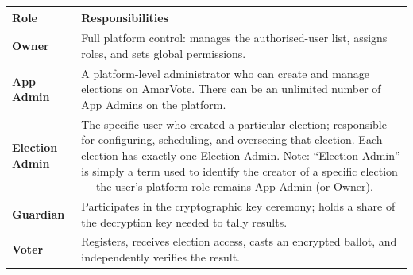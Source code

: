 \documentclass[12pt,a4paper,openany]{book}
\begin{document}
\begin{center}
	\begin{tabularx}{0.95\textwidth}{>{\bfseries}l X}
		\toprule
		\rowcolor{primaryblue}\color{white}Role & \color{white}Responsibilities                                                                                                                                                                                                                                                                                                      \\
		\midrule
		\rowcolor{lightgray}Owner               & Full platform control: manages the authorised-user list, assigns roles, and sets global permissions.                                                                                                                                                                                                                               \\
		App Admin                               & A platform-level administrator who can create and manage elections on AmarVote. There can be an unlimited number of App Admins on the platform.                                                                                                                                                                                    \\
		\rowcolor{lightgray}Election Admin      & The specific user who created a particular election; responsible for configuring, scheduling, and overseeing that election. Each election has exactly one Election Admin. Note: ``Election Admin'' is simply a term used to identify the creator of a specific election --- the user's platform role remains App Admin (or Owner). \\
		Guardian                                & Participates in the cryptographic key ceremony; holds a share of the decryption key needed to tally results.                                                                                                                                                                                                                       \\
		\rowcolor{lightgray}Voter               & Registers, receives election access, casts an encrypted ballot, and independently verifies the result.                                                                                                                                                                                                                             \\
		\bottomrule
	\end{tabularx}
\end{center}
\end{document}
